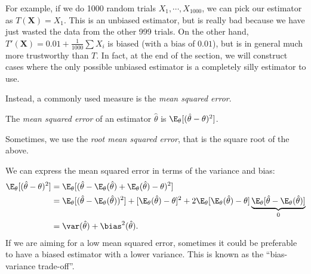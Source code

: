 \documentclass[a4paper]{article}
\begin{document}
For example, if we do 1000 random trials $X_1, \cdots, X_{1000}$, we can pick our estimator as $T(\mathbf{X}) = X_1$. This is an unbiased estimator, but is really bad because we have just wasted the data from the other 999 trials. On the other hand, $T'(\mathbf{X}) = 0.01 + \frac{1}{1000}\sum X_i$ is biased (with a bias of $0.01$), but is in general much more trustworthy than $T$. In fact, at the end of the section, we will construct cases where the only possible unbiased estimator is a completely silly estimator to use.

Instead, a commonly used measure is the \emph{mean squared error}.
\begin{defi}
  The \emph{mean squared error} of an estimator $\hat{\theta}$ is $\E_\theta[(\hat{\theta} - \theta)^2]$.

  Sometimes, we use the \emph{root mean squared error}, that is the square root of the above.
\end{defi}
We can express the mean squared error in terms of the variance and bias:
\begin{align*}
  \E_\theta[(\hat{\theta} - \theta)^2] &= \E_\theta[(\hat{\theta} - \E_\theta(\hat{\theta}) + \E_\theta(\hat{\theta}) - \theta)^2]\\
  &= \E_\theta[(\hat{\theta} - \E_\theta(\hat{\theta}))^2] + [\E_\theta(\hat{\theta}) - \theta]^2 + 2\E_{\theta}[\E_\theta(\hat{\theta}) - \theta]\underbrace{\E_\theta[\hat{\theta} - \E_\theta(\hat{\theta})]}_{0}\\
  &= \var(\hat{\theta}) + \bias^2(\hat{\theta}).
\end{align*}
If we are aiming for a low mean squared error, sometimes it could be preferable to have a biased estimator with a lower variance. This is known as the ``bias-variance trade-off''.
\end{document}
